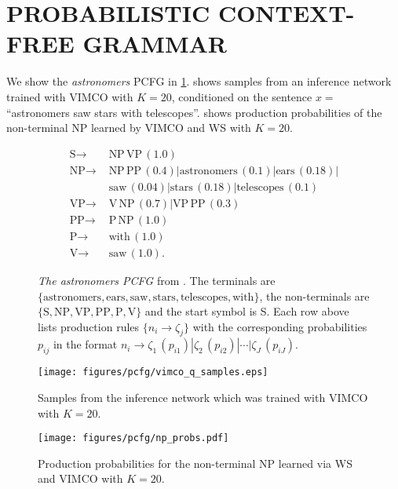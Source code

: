 
\section{PROBABILISTIC CONTEXT-FREE GRAMMAR}
\label{app:pcfg}

We show the \emph{astronomers} \gls{PCFG} in \cref{fig:app/pcfg/astronomers}.
 shows samples from an inference network trained with \gls{VIMCO} with $K = 20$, conditioned on the sentence $x = $ ``astronomers saw stars with telescopes''.
 shows production probabilities of the non-terminal NP learned by \gls{VIMCO} and \gls{WS} with $K = 20$.
\begin{figure}[htb]
  \begin{align*}
    \text{S} \to&\,\, \text{NP}\,\text{VP}\,(1.0) \\
    \text{NP} \to&\,\, \text{NP}\,\text{PP}\,(0.4) | \text{astronomers}\,(0.1) | \text{ears}\,(0.18) | \\
    &\,\, \text{saw}\,(0.04) | \text{stars}\,(0.18) | \text{telescopes}\,(0.1) \\
    \text{VP} \to&\,\, \text{V}\,\text{NP}\,(0.7) | \text{VP}\,\text{PP}\,(0.3) \\
    \text{PP} \to&\,\, \text{P}\,\text{NP}\,(1.0) \\
    \text{P} \to&\,\, \text{with}\,(1.0) \\
    \text{V} \to&\,\, \text{saw}\,(1.0).
  \end{align*}
  \caption{\emph{The astronomers \acrshort{PCFG}} from \citet[Table 11.2]{manning1999foundations}. The terminals are $\{\text{astronomers}, \text{ears}, \text{saw}, \text{stars}, \text{telescopes}, \text{with}\}$, the non-terminals are $\{\text{S}, \text{NP}, \text{VP}, \text{PP}, \text{P}, \text{V}\}$ and the start symbol is S.
  Each row above lists production rules $\{n_i \to \zeta_j\}$ with the corresponding probabilities $p_{ij}$ in the format $n_i \to \zeta_1\,(p_{i1}) | \zeta_2\,(p_{i2}) | \cdots | \zeta_J\,(p_{iJ})$.}
  \label{fig:app/pcfg/astronomers}
\end{figure}
\begin{figure}[htb]
  \texttt{[image: figures/pcfg/vimco\_q\_samples.eps]}
  \caption{Samples from the inference network which was trained with \gls{VIMCO} with $K = 20$.}
  \label{fig:experiments/pcfg/vimco_q_samples}
  \vspace*{-2ex}
\end{figure}
\begin{figure}[htb]
  \centering
  \texttt{[image: figures/pcfg/np\_probs.pdf]}
  \caption{Production probabilities for the non-terminal NP learned via \gls{WS} and \gls{VIMCO} with $K = 20$.}
  \label{fig:experiments/pcfg/production_probs}
  \vspace*{-2ex}
\end{figure}


